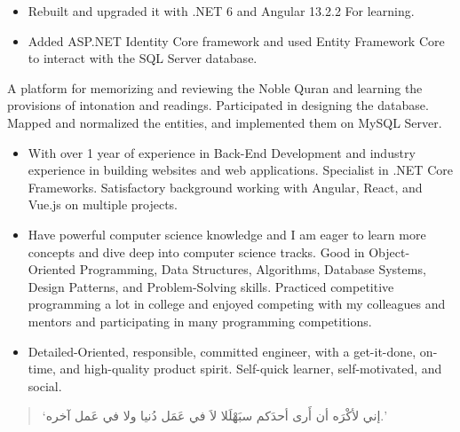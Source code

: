 \documentclass[10pt,a4paper,ragged2e,withhyper]{altacv}
\begin{document}
\begin{paracol}{2}
\divider

\begin{itemize}
\item Rebuilt and upgraded it with .NET 6 and Angular 13.2.2 For learning.
\item Added ASP.NET Identity Core framework and used Entity Framework Core to interact with the SQL Server database.
\end{itemize}

\divider

A platform for memorizing and reviewing the Noble Quran and learning the provisions of intonation and readings. Participated in designing the database. Mapped and normalized the entities, and implemented them on MySQL Server.

\medskip


\switchcolumn


\begin{itemize}
\item With over 1 year of experience in Back-End Development and industry experience in building websites and web applications. Specialist in .NET Core Frameworks. Satisfactory background working with Angular, React, and Vue.js on multiple projects.
\item Have powerful computer science knowledge and I am eager to learn more concepts and dive deep into computer science tracks. Good in Object-Oriented Programming, Data Structures, Algorithms, Database Systems, Design Patterns, and Problem-Solving skills. Practiced competitive programming a lot in college and enjoyed competing with my colleagues and mentors and participating in many programming competitions.
\item Detailed-Oriented, responsible, committed engineer, with a get-it-done, on-time, and high-quality product spirit. Self-quick learner, self-motivated, and social.
\end{itemize}


\begin{quote}
\begin{RLtext}
`إني لأكْرَه أن أَرى أحدَكم سبَهْلَلا لاَ في عَمَل دُنيا ولا في عَمل آخره.'
\end{RLtext}
\end{quote}


\end{paracol}
\end{document}
